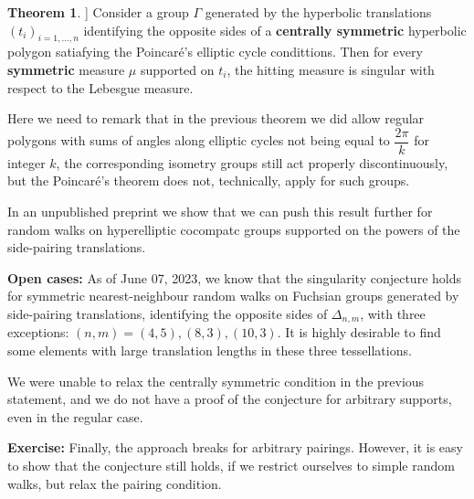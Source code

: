 \documentclass[11pt]{amsart}
\theoremstyle{definition}
\newtheorem{theorem}{Theorem}[section]
\begin{document}
	\begin{theorem}\cite{10.1093/imrn/rnaa213}]
		Consider a group $\Gamma$ generated by the hyperbolic translations $(t_i)_{i = 1, \dots, n}$ identifying the opposite sides of a \textbf{centrally symmetric} hyperbolic polygon satiafying the Poincar\'e's elliptic cycle condittions. Then for every \textbf{symmetric} measure $\mu$ supported on $t_i$, the hitting measure is singular with respect to the Lebesgue measure.  
	\end{theorem}
	
	Here we need to remark that in the previous theorem we did allow regular polygons with sums of angles along elliptic cycles not being equal to $\dfrac{2 \pi}{k}$ for integer $k$, the corresponding isometry groups still act properly discontinuously, but the Poincar\'e's theorem does not, technically, apply for such groups.
	
	In an unpublished preprint \cite{kosenko2023asymptotics} we show that we can push this result further for random walks on hyperelliptic cocompatc groups supported on the powers of the side-pairing translations.
	
	\textbf{Open cases:} As of June 07, 2023, we know that the singularity conjecture holds for symmetric nearest-neighbour random walks on Fuchsian groups generated by side-pairing translations, identifying the opposite sides of $\Delta_{n, m}$, with three exceptions: $(n, m) = (4, 5), (8, 3), (10, 3)$. It is highly desirable to find some elements with large translation lengths in these three tessellations.
	
	We were unable to relax the centrally symmetric condition in the previous statement, and we do not have a proof of the conjecture for arbitrary supports, even in the regular case.
	
	\textbf{Exercise:} Finally, the approach breaks for arbitrary pairings. However, it is easy to show that the conjecture still holds, if we restrict ourselves to simple random walks, but relax the pairing condition.
	
	
 	
\end{document}

